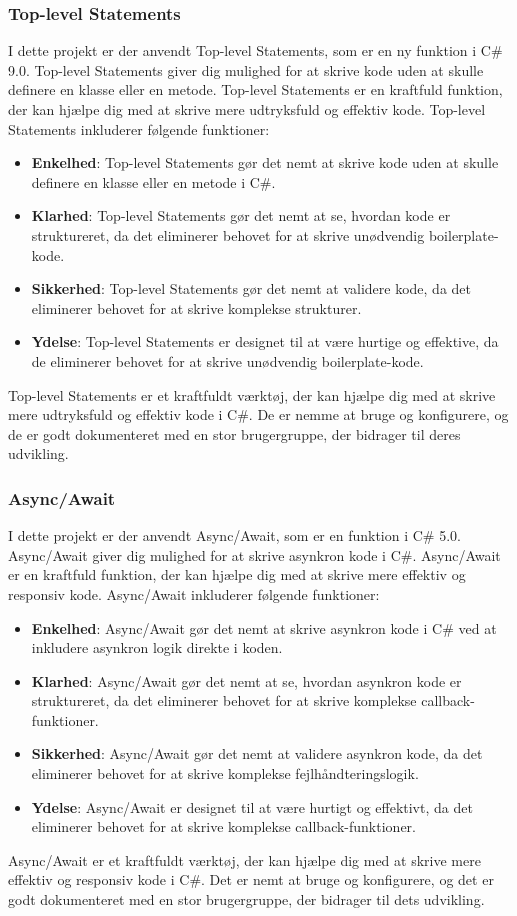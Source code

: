 \subsubsection{Top-level Statements}
I dette projekt er der anvendt Top-level Statements, som er en ny funktion i C\# 9.0. Top-level Statements giver dig mulighed for at skrive kode uden at skulle definere en klasse eller en metode. Top-level Statements er en kraftfuld funktion, der kan hjælpe dig med at skrive mere udtryksfuld og effektiv kode.
Top-level Statements inkluderer følgende funktioner:
\begin{itemize}
    \item \textbf{Enkelhed}: Top-level Statements gør det nemt at skrive kode uden at skulle definere en klasse eller en metode i C\#.
    \item \textbf{Klarhed}: Top-level Statements gør det nemt at se, hvordan kode er struktureret, da det eliminerer behovet for at skrive unødvendig boilerplate-kode.
    \item \textbf{Sikkerhed}: Top-level Statements gør det nemt at validere kode, da det eliminerer behovet for at skrive komplekse strukturer.
    \item \textbf{Ydelse}: Top-level Statements er designet til at være hurtige og effektive, da de eliminerer behovet for at skrive unødvendig boilerplate-kode.
\end{itemize}
Top-level Statements er et kraftfuldt værktøj, der kan hjælpe dig med at skrive mere udtryksfuld og effektiv kode i C\#. De er nemme at bruge og konfigurere, og de er godt dokumenteret med en stor brugergruppe, der bidrager til deres udvikling.

\subsubsection{Async/Await}
I dette projekt er der anvendt Async/Await, som er en funktion i C\# 5.0. Async/Await giver dig mulighed for at skrive asynkron kode i C\#. Async/Await er en kraftfuld funktion, der kan hjælpe dig med at skrive mere effektiv og responsiv kode.
Async/Await inkluderer følgende funktioner:
\begin{itemize}
    \item \textbf{Enkelhed}: Async/Await gør det nemt at skrive asynkron kode i C\# ved at inkludere asynkron logik direkte i koden.
    \item \textbf{Klarhed}: Async/Await gør det nemt at se, hvordan asynkron kode er struktureret, da det eliminerer behovet for at skrive komplekse callback-funktioner.
    \item \textbf{Sikkerhed}: Async/Await gør det nemt at validere asynkron kode, da det eliminerer behovet for at skrive komplekse fejlhåndteringslogik.
    \item \textbf{Ydelse}: Async/Await er designet til at være hurtigt og effektivt, da det eliminerer behovet for at skrive komplekse callback-funktioner.
\end{itemize}
Async/Await er et kraftfuldt værktøj, der kan hjælpe dig med at skrive mere effektiv og responsiv kode i C\#. Det er nemt at bruge og konfigurere, og det er godt dokumenteret med en stor brugergruppe, der bidrager til dets udvikling.


